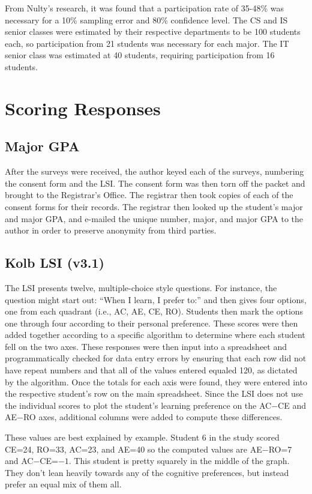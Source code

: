 From Nulty's research, it was found that a participation rate of 35-48\% was necessary for a 10\% sampling error and 80\% confidence level. The CS and IS senior classes were estimated by their respective departments to be 100 students each, so participation from 21 students was necessary for each major. The IT senior class was estimated at 40 students, requiring participation from 16 students.

\section{Scoring Responses}
\subsection{Major GPA}
After the surveys were received, the author keyed each of the surveys, numbering the consent form and the LSI. The consent form was then torn off the packet and brought to the Registrar's Office. The registrar then took copies of each of the consent forms for their records. The registrar then looked up the student's major and major GPA, and e-mailed the unique number, major, and major GPA to the author in order to preserve anonymity from third parties.

\subsection{Kolb LSI (v3.1)}
The LSI presents twelve, multiple-choice style questions. For instance, the question might start out: ``When I learn, I prefer to:'' and then gives four options, one from each quadrant (i.e., AC, AE, CE, RO). Students then mark the options one through four according to their personal preference. These scores were then added together according to a specific algorithm to determine where each student fell on the two axes. These responses were then input into a spreadsheet and programmatically checked for data entry errors by ensuring that each row did not have repeat numbers and that all of the values entered equaled 120, as dictated by the algorithm. Once the totals for each axis were found, they were entered into the respective student's row on the main spreadsheet. Since the LSI does not use the individual scores to plot the student's learning preference on the AC$-$CE and AE$-$RO axes, additional columns were added to compute these differences.

These values are best explained by example. Student 6 in the study scored CE=24, RO=33, AC=23, and AE=40 so the computed values are AE$-$RO=7 and AC$-$CE=$-1$. This student is pretty squarely in the middle of the graph. They don't lean heavily towards any of the cognitive preferences, but instead prefer an equal mix of them all.

